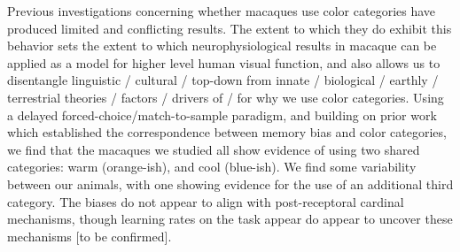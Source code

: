 Previous investigations concerning whether macaques use color categories have produced limited and conflicting results. 
The extent to which they do exhibit this behavior sets the extent to which neurophysiological results in macaque can be applied as a model for higher level human visual function, and also allows us to disentangle linguistic / cultural / top-down from innate / biological / earthly / terrestrial theories / factors / drivers of / for why we use color categories.
Using a delayed forced-choice/match-to-sample paradigm, and building on prior work which established the correspondence between memory bias and color categories, we find that the macaques we studied all show evidence of using two shared categories: warm (orange-ish), and cool (blue-ish). 
We find some variability between our animals, with one showing evidence for the use of an additional third category. 
The biases do not appear to align with post-receptoral cardinal mechanisms, though learning rates on the task appear do appear to uncover these mechanisms [to be confirmed].


